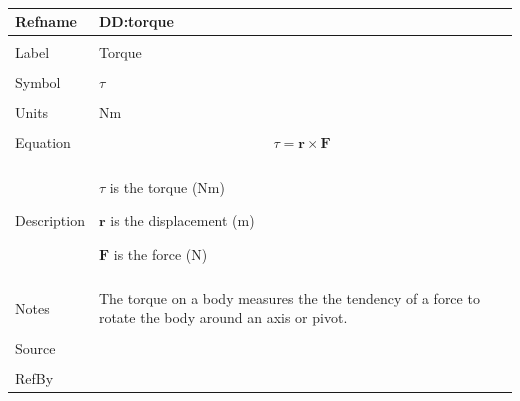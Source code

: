 \documentclass[12pt]{article}
\begin{document}
\par~

\noindent \begin{minipage}{\textwidth}
\begin{tabular}{p{} p{}}
\toprule \textbf{Refname} & \textbf{DD:torque}
\label{DD:torque}
\\ \midrule \\
Label & Torque
        \\ \midrule \\
        Symbol & $τ$
                 \\ \midrule \\
                 Units & Nm
                         \\ \midrule \\
                         Equation & \begin{displaymath}
                                    τ=\mathbf{r}\times\mathbf{F}
                                    \end{displaymath}
                                    \\ \midrule \\
                                    Description & \begin{symbDescription}
                                                  \item{$τ$ is the torque (Nm)}
                                                  \item{$\mathbf{r}$ is the displacement (m)}
                                                  \item{$\mathbf{F}$ is the force (N)}
                                                  \end{symbDescription}
                                                  \\ \midrule \\
                                                  Notes & The torque on a body measures the the tendency of a force to rotate the body around an axis or pivot.
                                                          \\ \midrule \\
                                                          Source & \\ \midrule \\
                                                                   RefBy & 
\\ \bottomrule \end{tabular}
\end{minipage}
\end{document}
